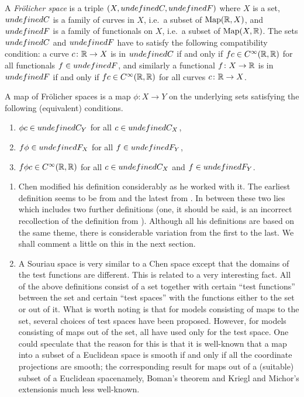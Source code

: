 \documentclass[%
a4paper,%
arxiv,%
defaults
]{myclass}
\begin{document}
\begin{defn}
 A \emph{Fr\"olicher space} is a triple \((X, \m{C}, \m{F})\) where \(X\) is a set, \(\m{C}\) is a family of curves in \(X\), i.e.~a subset of \(\operatorname{Map}(\mathbb{R}, X)\), and \(\m{F}\) is a family of functionals on \(X\), i.e.~a subset of \(\operatorname{Map}(X, \mathbb{R})\).
 The sets \(\m{C}\) and \(\m{F}\) have to satisfy the following compatibility condition: a curve \(c \colon \mathbb{R} \to X\) is in \(\m{C}\) if and only if \(f c \in C^\infty(\mathbb{R},\mathbb{R})\) for all functionals \(f \in \m{F}\), and similarly a functional \(f \colon X \to \mathbb{R}\) is in \(\m{F}\) if and only if \(f c \in C^\infty(\mathbb{R}, \mathbb{R})\) for all curves \(c \colon \mathbb{R} \to X\).

 A map of Fr\"olicher spaces is a map \(\phi \colon X \to Y\) on the underlying sets satisfying the following (equivalent) conditions.
 \begin{enumerate}
 \item
   \(\phi c \in \m{C}_Y\) for all \(c \in \m{C}_X\),
 \item
   \(f \phi \in \m{F}_X\) for all \(f \in \m{F}_Y\),
 \item
   \(f \phi c \in C^\infty(\mathbb{R}, \mathbb{R})\)
  for all \(c \in \m{C}_X\) and \(f \in \m{F}_Y\).
 \end{enumerate}
\end{defn}

\begin{remark}
\begin{enumerate}
\item
Chen modified his definition considerably as he worked with it.
The earliest definition seems to be from \cite{kc} and the latest from \cite{kc3}.
In between these two lies \cite{kc5} which includes two further definitions (one, it should be said, is an incorrect recollection of the definition from \cite{kc}).
Although all his definitions are based on the same theme, there is considerable variation from the first to the last.
We shall comment a little on this in the next section.

\item 
A Souriau space is very similar to a Chen space except that the domains of the test functions are different.
This is related to a very interesting fact.
All of the above definitions consist of a set together with certain ``test functions'' between the set and certain ``test spaces'' with the functions either to the set or out of it.
What is worth noting is that for models consisting of maps to the set, several choices of test spaces have been proposed.
However, for models consisting of maps out of the set, all have used only \R for the test space.
One could speculate that the reason for this is that it is well\hyp{}known that a map into a subset of a Euclidean space is smooth if and only if all the coordinate projections are smooth; the corresponding result for maps out of a (suitable) subset of a Euclidean space\emhyp{}namely, Boman's theorem and Kriegl and Michor's extension\emhyp{}is much less well\hyp{}known.
\end{enumerate}
\end{remark}
\end{document}
